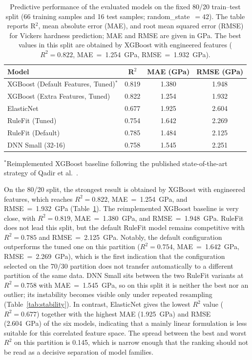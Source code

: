 \documentclass[pdflatex,sn-mathphys-num]{sn-jnl}%
\newif\ifrevmarks%
\newcommand{\revmark}[1]{\ifrevmarks\textcolor{revblue}{#1}\else#1\fi}%
\theoremstyle{thmstyleone}%
\theoremstyle{thmstyletwo}%
\theoremstyle{thmstylethree}%
\begin{document}
\begin{table}[h]
\footnotesize
\centering
\renewcommand{\arraystretch}{1.4}
\caption{Predictive performance of the evaluated models on the fixed 80/20 train--test split (66 training samples and 16 test samples; random\_state~$= 42$). The table reports R$^2$, mean absolute error (MAE), and root mean squared error (RMSE) for Vickers hardness prediction; MAE and RMSE are given in GPa. The best values in this split are obtained by XGBoost with engineered features ($R^2=0.822$, MAE~=~1.254~GPa, RMSE~=~1.932~GPa).}
\label{tab:80_20}
\begin{tabular}{lccc}
\hline
\textbf{Model} & \textbf{R$^2$} & \textbf{MAE (GPa)} & \textbf{RMSE (GPa)} \\ \hline
XGBoost (Default Features, Tuned)$^{*}$ & 0.819 & 1.380 & 1.948 \\
XGBoost (Extra Features, Tuned)   & 0.822 & 1.254 & 1.932 \\
ElasticNet                        & 0.677 & 1.925 & 2.604 \\
RuleFit (Tuned)                   & 0.754 & 1.642 & 2.269 \\
RuleFit (Default)                 & 0.785 & 1.484 & 2.125 \\
DNN Small (32-16)                 & 0.758 & 1.545 & 2.251 \\
\hline
\end{tabular}
\vspace{1mm}
\scriptsize{$^{*}$Reimplemented XGBoost baseline following the published state-of-the-art strategy of Qadir et al.~\cite{qadir2024predicting}.}
\end{table}
\FloatBarrier

\revmark{On the 80/20 split, the strongest result is obtained by XGBoost with engineered features, which reaches $R^2=0.822$, MAE~=~1.254~GPa, and RMSE~=~1.932~GPa (Table~\ref{tab:80_20}). The reimplemented XGBoost baseline is very close, with $R^2=0.819$, MAE~=~1.380~GPa, and RMSE~=~1.948~GPa. RuleFit does not lead this split, but the default RuleFit model remains competitive with $R^2=0.785$ and RMSE~=~2.125~GPa. Notably, the default configuration outperforms the tuned one on this partition ($R^2=0.754$, MAE~=~1.642~GPa, RMSE~=~2.269~GPa), which is the first indication that the configuration selected on the 70/30 partition does not transfer automatically to a different partition of the same data. DNN Small sits between the two RuleFit variants at $R^2=0.758$ with MAE~=~1.545~GPa, so on this split it is neither the best nor an outlier; its instability becomes visible only under repeated resampling (Table~\ref{tab:stability}). In contrast, ElasticNet gives the lowest $R^2$ value ($R^2=0.677$) together with the highest MAE (1.925~GPa) and RMSE (2.604~GPa) of the six models, indicating that a mainly linear formulation is less suitable for this correlated feature space. The spread between the best and worst $R^2$ on this partition is 0.145, which is narrow enough that the ranking should not be read as a decisive separation of model families.}
\end{document}
